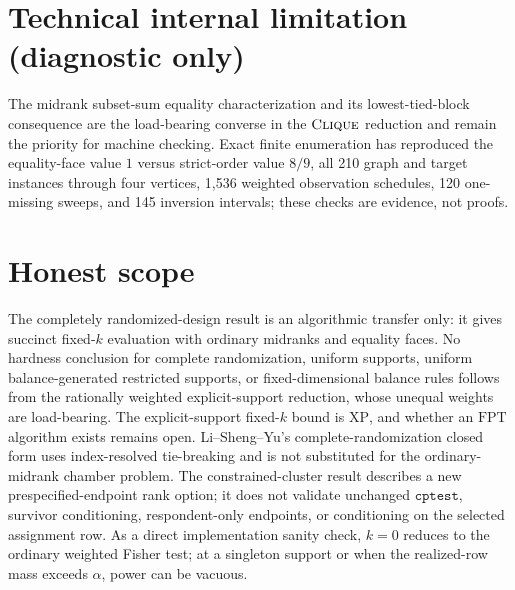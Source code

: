 \documentclass{article}
\begin{document}
\section*{Technical internal limitation (diagnostic only)}

The midrank subset-sum equality characterization and its lowest-tied-block consequence are the load-bearing converse in the \(\textsc{Clique}\) reduction and remain the priority for machine checking. Exact finite enumeration has reproduced the equality-face value \(1\) versus strict-order value \(8/9\), all 210 graph and target instances through four vertices, 1,536 weighted observation schedules, 120 one-missing sweeps, and 145 inversion intervals; these checks are evidence, not proofs.

\section{Honest scope}

The completely randomized-design result is an algorithmic transfer only: it gives succinct fixed-\(k\) evaluation with ordinary midranks and equality faces. No hardness conclusion for complete randomization, uniform supports, uniform balance-generated restricted supports, or fixed-dimensional balance rules follows from the rationally weighted explicit-support reduction, whose unequal weights are load-bearing. The explicit-support fixed-\(k\) bound is \(\mathrm{XP}\), and whether an \(\mathrm{FPT}\) algorithm exists remains open. Li--Sheng--Yu's complete-randomization closed form uses index-resolved tie-breaking and is not substituted for the ordinary-midrank chamber problem. The constrained-cluster result describes a new prespecified-endpoint rank option; it does not validate unchanged \(\texttt{cptest}\), survivor conditioning, respondent-only endpoints, or conditioning on the selected assignment row. As a direct implementation sanity check, \(k=0\) reduces to the ordinary weighted Fisher test; at a singleton support or when the realized-row mass exceeds \(\alpha\), power can be vacuous.
\end{document}

